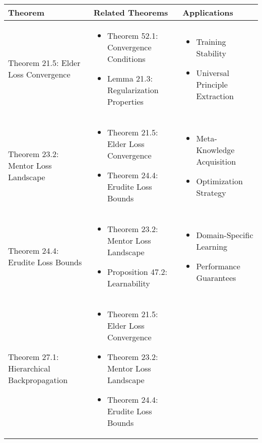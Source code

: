 \begin{table}[h]
\centering
\begin{tabular}{|l|p{7cm}|p{4cm}|}
\hline
\textbf{Theorem} & \textbf{Related Theorems} & \textbf{Applications} \\
\hline
Theorem 21.5: Elder Loss Convergence &
\begin{itemize}
    \item Theorem 52.1: Convergence Conditions
    \item Lemma 21.3: Regularization Properties
\end{itemize} &
\begin{itemize}
    \item Training Stability
    \item Universal Principle Extraction
\end{itemize} \\
\hline
Theorem 23.2: Mentor Loss Landscape &
\begin{itemize}
    \item Theorem 21.5: Elder Loss Convergence
    \item Theorem 24.4: Erudite Loss Bounds
\end{itemize} &
\begin{itemize}
    \item Meta-Knowledge Acquisition
    \item Optimization Strategy
\end{itemize} \\
\hline
Theorem 24.4: Erudite Loss Bounds &
\begin{itemize}
    \item Theorem 23.2: Mentor Loss Landscape
    \item Proposition 47.2: Learnability
\end{itemize} &
\begin{itemize}
    \item Domain-Specific Learning
    \item Performance Guarantees
\end{itemize} \\
\hline
Theorem 27.1: Hierarchical Backpropagation &
\begin{itemize}
    \item Theorem 21.5: Elder Loss Convergence
    \item Theorem 23.2: Mentor Loss Landscape
    \item Theorem 24.4: Erudite Loss Bounds
\end{itemize} &
\begin{itemize}

\end{itemize}
\end{tabular}
\end{table}
